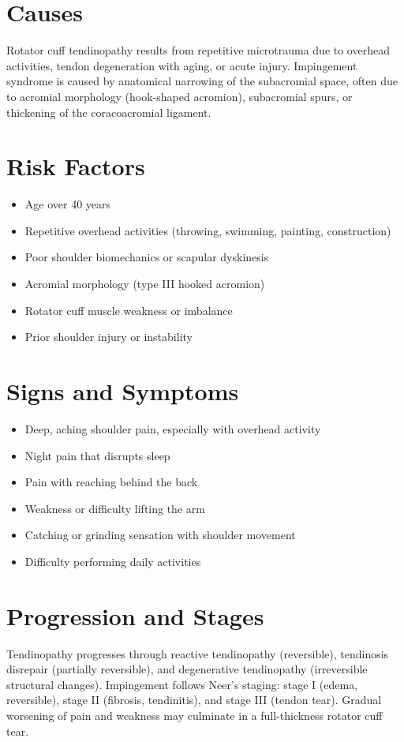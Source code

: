 \section{Causes}
Rotator cuff tendinopathy results from repetitive microtrauma due to overhead activities, tendon degeneration with aging, or acute injury. Impingement syndrome is caused by anatomical narrowing of the subacromial space, often due to acromial morphology (hook-shaped acromion), subacromial spurs, or thickening of the coracoacromial ligament.

\section{Risk Factors}
\begin{itemize}[noitemsep]
  \item Age over 40 years
  \item Repetitive overhead activities (throwing, swimming, painting, construction)
  \item Poor shoulder biomechanics or scapular dyskinesis
  \item Acromial morphology (type III hooked acromion)
  \item Rotator cuff muscle weakness or imbalance
  \item Prior shoulder injury or instability
\end{itemize}

\section{Signs and Symptoms}
\begin{itemize}[noitemsep]
  \item Deep, aching shoulder pain, especially with overhead activity
  \item Night pain that disrupts sleep
  \item Pain with reaching behind the back
  \item Weakness or difficulty lifting the arm
  \item Catching or grinding sensation with shoulder movement
  \item Difficulty performing daily activities
\end{itemize}

\section{Progression and Stages}
Tendinopathy progresses through reactive tendinopathy (reversible), tendinosis disrepair (partially reversible), and degenerative tendinopathy (irreversible structural changes). Impingement follows Neer's staging: stage I (edema, reversible), stage II (fibrosis, tendinitis), and stage III (tendon tear). Gradual worsening of pain and weakness may culminate in a full-thickness rotator cuff tear.

